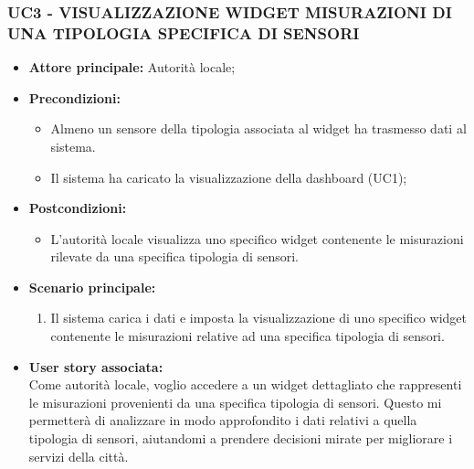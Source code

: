 \subsubsection{UC3 - VISUALIZZAZIONE WIDGET MISURAZIONI DI UNA TIPOLOGIA SPECIFICA DI SENSORI}

\begin{itemize}
    \item \textbf{Attore principale:} Autorità locale;
    \item \textbf{Precondizioni:}
        \begin{itemize}
            \item Almeno un sensore della tipologia associata al widget ha trasmesso dati al sistema.
            \item Il sistema ha caricato la visualizzazione della dashboard (UC1);
        \end{itemize}
    \item \textbf{Postcondizioni:}
        \begin{itemize}
            \item L'autorità locale visualizza uno specifico widget contenente le misurazioni rilevate da una specifica tipologia di sensori.
        \end{itemize}
    \item \textbf{Scenario principale:}
        \begin{enumerate}
            \item Il sistema carica i dati e imposta la visualizzazione di uno specifico widget contenente le misurazioni relative ad una specifica tipologia di sensori.
        \end{enumerate}
    \item \textbf{User story associata:} \\
        Come autorità locale, voglio accedere a un widget dettagliato che rappresenti le misurazioni provenienti da una specifica tipologia di sensori. Questo mi permetterà di analizzare in modo approfondito i dati relativi a quella tipologia di sensori, aiutandomi a prendere decisioni mirate per migliorare i servizi della città.
\end{itemize}